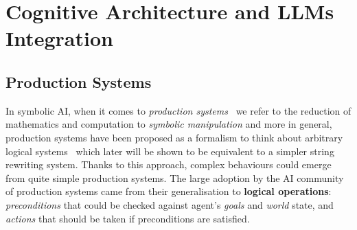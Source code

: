\section{Cognitive Architecture and LLMs Integration}\label{background}
\subsection{Production Systems}
In symbolic AI, when it comes to \emph{production
systems}~\cite{humanproblemsolving} we refer to the reduction of mathematics and
computation to \emph{symbolic manipulation} and more in general, production
systems have been proposed as a formalism to think about arbitrary logical
systems~\cite{Post1943-POSFRO} which later will be shown to be equivalent to a
simpler string rewriting system. Thanks to this approach, complex behaviours
could emerge from quite simple production systems. The large adoption by the AI
community of production systems came from their generalisation to
\textbf{logical operations}: \emph{preconditions} that could be checked against
agent's \emph{goals} and \emph{world} state, and \emph{actions} that should be
taken if preconditions are satisfied.

